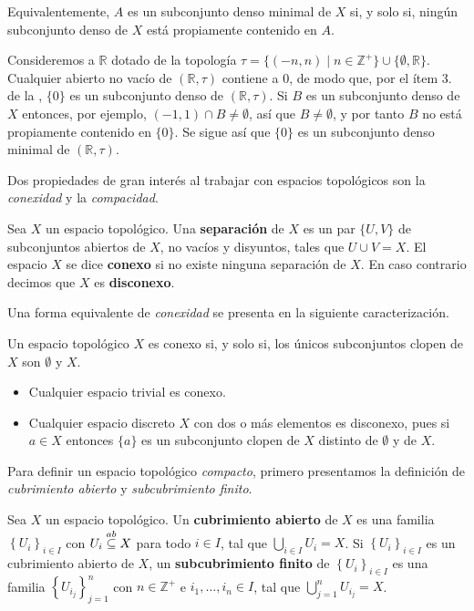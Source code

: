 Equivalentemente, $A$ es un subconjunto denso minimal de $X$ si, y solo si, ningún subconjunto denso de $X$ está propiamente contenido en $A$.
\begin{Ejm}
   Consideremos a $\mathbb{R}$ dotado de la topología $\tau=\{(-n,n)\mid n\in \mathbb{Z}^+\}\cup\{\emptyset, \mathbb{R}\}$. Cualquier abierto no vacío de $(\mathbb{R},\tau)$ contiene a $0$, de modo que, por el ítem 3. de la , $\{0\}$ es un subconjunto denso de $(\mathbb{R},\tau)$. Si $B$ es un subconjunto denso de $X$ entonces, por ejemplo, $(-1,1)\cap B\ne \emptyset$, así que $B\ne \emptyset$, y por tanto $B$ no está propiamente contenido en $\{0\}$. Se sigue así que $\{0\}$ es un subconjunto denso minimal de $(\mathbb{R},\tau)$. 
\end{Ejm}
Dos propiedades de gran interés al trabajar con espacios topológicos son la \textit{conexidad} y la \textit{compacidad}.
\begin{Def}
   Sea $X$ un espacio topológico. Una \textbf{separación} de $X$ es un par $\{U,V\}$ de subconjuntos abiertos de $X$, no vacíos y disyuntos, tales que $U\cup V=X$. El espacio $X$ se dice \textbf{conexo} si no existe ninguna separación de $X$. En caso contrario decimos que $X$ es \textbf{disconexo}.
\end{Def}
Una forma equivalente de \textit{conexidad} se presenta en la siguiente caracterización.
\begin{Prop}\label{Prop:Caracterizacion_conexo}
   Un espacio topológico $X$ es conexo si, y solo si, los únicos subconjuntos clopen de $X$ son $\emptyset$ y $X$. 
\end{Prop}
\begin{Ejm}
   \phantom{o}
   \begin{itemize}
      \item Cualquier espacio trivial es conexo.
      \item Cualquier espacio discreto $X$ con dos o más elementos es disconexo, pues si $a\in X$ entonces $\{a\}$ es un subconjunto clopen de $X$ distinto de $\emptyset$ y de $X$.
   \end{itemize}
\end{Ejm}
Para definir un espacio topológico \textit{compacto}, primero presentamos la definición de \textit{cubrimiento abierto} y \textit{subcubrimiento finito}.
\begin{Def}
   Sea $X$ un espacio topológico. Un \textbf{cubrimiento abierto} de $X$ es una familia $\left\lbrace U_i\right\rbrace_{i\in I}$ con $U_i\stackrel{ab}{\subseteq} X$ para todo $i\in I$, tal que $\bigcup_{i\in I}U_i=X$. Si $\left\lbrace U_i\right\rbrace_{i\in I}$ es un cubrimiento abierto de $X$, un \textbf{subcubrimiento finito} de $\left\lbrace U_i\right\rbrace_{i\in I}$ es una familia $\left\lbrace U_{i_j}\right\rbrace_{j=1}^{n}$ con $n\in \mathbb{Z}^+$ e $i_1,\dots,i_n\in I$, tal que $\bigcup_{j=1}^{n}U_{i_j}=X$.
\end{Def}
